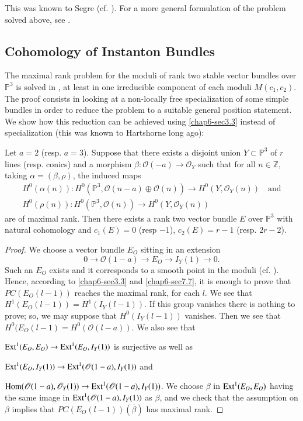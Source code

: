 \begin{remark*}
This was known to Segre (cf. \cite{chap6-WG1}). For a more general
formulation of the problem solved above, see \cite{chap6-WG2}. 
\end{remark*}

\subsection{Cohomology of Instanton Bundles}\label{chap6-sec8.3} 

The maximal rank problem for the moduli of rank two stable vector
bundles over $\mathbb{P}^{3}$ is solved in \cite{chap6-HH2}, at least
in one irreducible component of each moduli $M(c_{1},c_{2})$. The
proof consists in looking at a non-locally free specialization of some
simple bundles in order to reduce the problem to a suitable general
position statement. We show how this reduction can be achieved
using \ref{chap6-sec3.3} instead of specialization (this was known to
Hartshorne long ago):

\begin{prop*}
Let $a=2$ (resp. $a=3$). Suppose that there exists a disjoint union
$Y\subset \mathbb{P}^{3}$ of $r$ lines (resp. conics) and a morphism
$\beta:\mathscr{O}(-a)\to \mathscr{O}_{Y}$ such that for all
$n\in \mathbb{Z}$, taking $\alpha=(\beta,\rho)$, the induced maps 
\begin{gather*}
H^{0}(\alpha(n)):H^{0}(\mathbb{P}^{3},\mathscr{O}(n-a)\oplus \mathscr{O}(n))\to
H^{0}(Y,\mathscr{O}_{Y}(n))\quad\text{and}\\[3pt]
H^{0}(\rho(n)):H^{0}(\mathbb{P}^{3},\mathscr{O}(n))\to
H^{0}(Y,\mathscr{O}_{Y}(n)) 
\end{gather*}\pageoriginale
are of maximal rank. Then there exists a rank two vector bundle $E$
over $\mathbb{P}^{3}$ with natural cohomology and $c_{1}(E)=0$ (resp
$-1$), $c_{2}(E)=r-1$ (resp. $2r-2$). 
\end{prop*}

\begin{proof}
We choose a vector bundle $E_{O}$ sitting in an extension
$$
0\to \mathscr{O}(1-a)\to E_{O}\to I_{Y}(1)\to 0.
$$
Such an $E_{O}$ exists and it corresponds to a smooth point in the
moduli (cf. \cite{chap6-H2}). Hence, according to \ref{chap6-sec3.3}
and \ref{chap6-sec7.7}, it is enough to prove that $PC(E_{O}(l-1))$
reaches the maximal rank, for each $l$. We see that
$H^{1}(E_{O}(l-1))=H^{1}(I_{Y}(l-1))$. If this group vanishes there is
nothing to prove; so, we may suppose that $H^{0}(I_{Y}(l-1))$
vanishes. Then we see that
$H^{0}(E_{O}(l-1)=H^{0}(\mathscr{O}(l-a))$. We also see that

$\operatorname{Ext}^{1}(E_{O},E_{O})\to \operatorname{Ext}^{1}(E_{O},I_{Y}(1))$ is surjective as
well as 

$\operatorname{Ext}^{1}(E_{O},I_{Y}(1))\to \operatorname{Ext}^{1}(\mathscr{O}(1-a),I_{Y}(1))$ and

$\operatorname{Hom}(\mathscr{O}(1-a),\mathscr{O}_{Y}(1))\to \operatorname{Ext}^{1}(\mathscr{O}(1-a),I_{Y}(1))$. We
choose $\beta$ in $\operatorname{Ext}^{1}(E_{O},E_{O})$ having the same image in
$\operatorname{Ext}^{1}(\mathscr{O}(1-a),I_{Y}(1))$ as $\beta$, and we check that
the assumption on $\beta$ implies that
$PC(E_{O}(l-1))(\overline{\beta})$ has maximal rank.
\end{proof}

